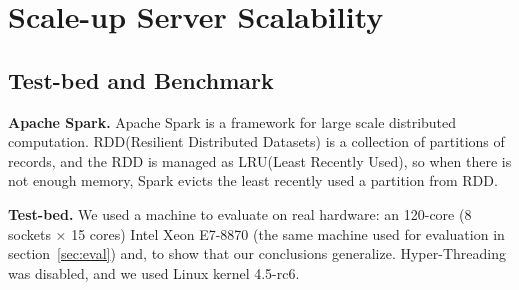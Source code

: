 
\section{Scale-up Server Scalability}
\label{sec:scale}

\subsection{Test-bed and Benchmark}

\ifkor
\noindent
\textbf{Apache Spark. }
Apache Spark is a framework for large scale distributed computation.
RDD(Resilient Distributed Datasets) is a collection of partitions of records, 
and the RDD is managed as LRU(Least Recently Used), so when there is not enough
memory, Spark evicts the least recently used a partition from RDD.


\else
\fi

\ifkor
\noindent
\textbf{Test-bed. }
We used a machine to evaluate on real hardware: an 120-core (8 sockets × 15
cores) Intel Xeon E7-8870 (the same machine used for evaluation in section~\ref{sec:eval})
and, to show that our conclusions generalize.
Hyper-Threading was disabled, and we used Linux kernel 4.5-rc6.


